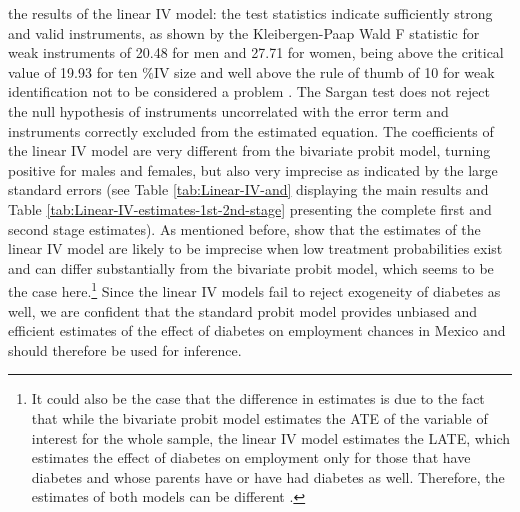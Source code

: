the results of the linear \ac{IV} model: the test statistics indicate
sufficiently strong and valid instruments, as shown by the Kleibergen-Paap
Wald F statistic for weak instruments of 20.48 for men and 27.71 for
women, being above the critical value of 19.93 for ten \%\ac{IV}
size and well above the rule of thumb of 10 for weak identification
not to be considered a problem \parencite{Staiger1997,Baum2007}. The
Sargan test does not reject the null hypothesis of instruments uncorrelated
with the error term and instruments correctly excluded from the estimated
equation. The coefficients of the linear \ac{IV} model are very different
from the bivariate probit model, turning positive for males and females,
but also very imprecise as indicated by the large standard errors
(see Table \ref{tab:Linear-IV-and} displaying the main results and
Table \ref{tab:Linear-IV-estimates-1st-2nd-stage}
presenting the complete first and second stage estimates). As mentioned
before, \textcite{Chiburis2012} show that the estimates of the linear
\ac{IV} model are likely to be imprecise when low treatment probabilities
exist and can differ substantially from the bivariate probit model,
which seems to be the case here.\footnote{It could also be the case that the difference in estimates is due
to the fact that while the bivariate probit model estimates the \ac{ATE}
of the variable of interest for the whole sample, the linear \ac{IV}
model estimates the \ac{LATE}, which estimates the effect of diabetes
on employment only for those that have diabetes and whose parents
have or have had diabetes as well. Therefore, the estimates of both
models can be different \parencite{Angrist2009a,Chiburis2012}.} Since the linear \ac{IV} models fail to reject exogeneity of diabetes
as well, we are confident that the standard probit model provides
unbiased and efficient estimates of the effect of diabetes on employment
chances in Mexico and should therefore be used for inference.


